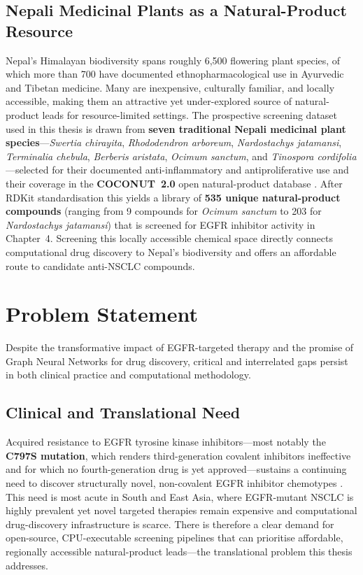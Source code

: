 \subsection{Nepali Medicinal Plants as a Natural-Product Resource}

Nepal's Himalayan biodiversity spans roughly 6,500 flowering plant species, of which
more than 700 have documented ethnopharmacological use in Ayurvedic and Tibetan
medicine. Many are inexpensive, culturally familiar, and locally accessible, making
them an attractive yet under-explored source of natural-product leads for
resource-limited settings. The prospective screening dataset used in this thesis is
drawn from \textbf{seven traditional Nepali medicinal plant species}---\textit{Swertia
chirayita}, \textit{Rhododendron arboreum}, \textit{Nardostachys jatamansi},
\textit{Terminalia chebula}, \textit{Berberis aristata}, \textit{Ocimum sanctum}, and
\textit{Tinospora cordifolia}---selected for their documented anti-inflammatory and
antiproliferative use and their coverage in the \textbf{COCONUT~2.0} open
natural-product database \parencite{sorokina2021coconut}. After RDKit standardisation
this yields a library of \textbf{535 unique natural-product compounds} (ranging from 9
compounds for \textit{Ocimum sanctum} to 203 for \textit{Nardostachys jatamansi}) that
is screened for EGFR inhibitor activity in Chapter~4. Screening this locally accessible
chemical space directly connects computational drug discovery to Nepal's biodiversity
and offers an affordable route to candidate anti-NSCLC compounds.

\section{Problem Statement}

Despite the transformative impact of EGFR-targeted therapy and the promise of
Graph Neural Networks for drug discovery, critical and interrelated gaps persist
in both clinical practice and computational methodology.

\subsection{Clinical and Translational Need}

Acquired resistance to EGFR tyrosine kinase inhibitors---most notably the
\textbf{C797S mutation}, which renders third-generation covalent inhibitors
ineffective and for which no fourth-generation drug is yet approved---sustains a
continuing need to discover structurally novel, non-covalent EGFR inhibitor
chemotypes \parencite{rotow2023egfr}. This need is most acute in South and East Asia,
where EGFR-mutant NSCLC is highly prevalent yet novel targeted therapies remain
expensive and computational drug-discovery infrastructure is scarce. There is
therefore a clear demand for open-source, CPU-executable screening pipelines that can
prioritise affordable, regionally accessible natural-product leads---the translational
problem this thesis addresses.

